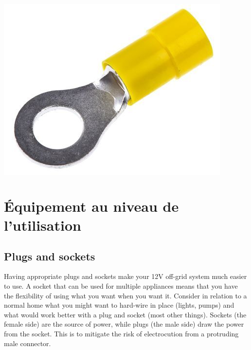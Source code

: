 \documentclass{article}
\theoremstyle{definition}
\theoremstyle{definition}
\theoremstyle{remark}
\begin{document}
      \begin{center}
        \includegraphics[width=0.15\paperwidth]{../Images/image_8_5_(ring_connector).png}
      \end{center}
    



{\color{blue}\section{Équipement au niveau de l'utilisation}} %
\label{sec:equipement_au_niveau_de_l_utilisation}

  {\color{blue}\subsection{Plugs and sockets}} %
  \label{sub:plugs_and_sockets}

    Having appropriate plugs and sockets make your 12V off-grid system much easier to use. A socket that can be used for multiple appliances means that you have the flexibility of using what you want when you want it. Consider in relation to a normal home what you might want to hard-wire in place (lights, pumps) and what would work better with a plug and socket (most other things). Sockets (the female side) are the source of power, while plugs (the male side) draw the power from the socket. This is to mitigate the risk of electrocution from a protruding male connector. 
\end{document}
